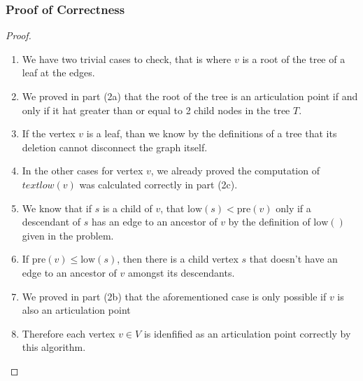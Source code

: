 \documentclass{article}
\begin{document}
\subsubsection{Proof of Correctness}
\begin{proof}
      \begin{enumerate}
            \item We have two trivial cases to check, that is where \(v\) is a root of the
                  tree of a leaf at the edges.
            \item We proved in part (2a) that the root of the tree is an articulation
                  point if and only if it hat greater than or equal to 2 child nodes in the tree
                  \(T\).
            \item If the vertex \(v\) is a leaf, than we know by the definitions of a tree
                  that its deletion cannot disconnect the graph itself.
            \item In the other cases for vertex \(v\), we already proved the computation
                  of \(text{low}(v)\) was calculated correctly in part (2c).
            \item We know that if \(s\) is a child of \(v\), that \(\text{low}(s) <
                  \text{pre}(v)\) only if a descendant of \(s\) has an edge to an ancestor of
                  \(v\) by the definition of \(\text{low}()\) given in the problem.
            \item If \( \text{pre}(v) \leq \text{low}(s) \), then there is a child vertex
                  \(s\) that doesn't have an edge to an ancestor of \(v\) amongst its
                  descendants.
            \item We proved in part (2b) that the aforementioned case is only possible if
                  \(v\) is also an articulation point
            \item Therefore each vertex \(v \in V\) is idenfified as an articulation point
                  correctly by this algorithm.
      \end{enumerate}
\end{proof}
\end{document}
